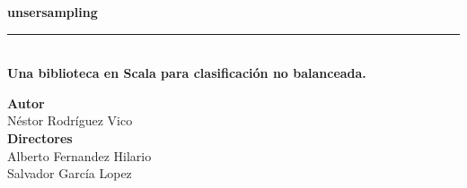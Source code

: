 \begin{titlepage}
 
 
\setlength{\centeroffset}{-0.5\oddsidemargin}
\addtolength{\centeroffset}{0.5\evensidemargin}
\thispagestyle{empty}

\noindent\hspace*{\centeroffset}\begin{minipage}{\textwidth}

\centering

\vspace{3.3cm}

\vspace{0.5cm}


{\Huge\bfseries unsersampling\\
}
\noindent\rule[-1ex]{\textwidth}{3pt}\\[3.5ex]
{\large\bfseries Una biblioteca en Scala para clasificación no balanceada.\\[4cm]}
\end{minipage}

\vspace{2.5cm}
\noindent\hspace*{\centeroffset}\begin{minipage}{\textwidth}
\centering

\textbf{Autor}\\ {Néstor Rodríguez Vico}\\[2.5ex]
\textbf{Directores}\\
{Alberto Fernandez Hilario\\
Salvador García Lopez}\\[2cm]
\end{minipage}

 
\end{titlepage}


